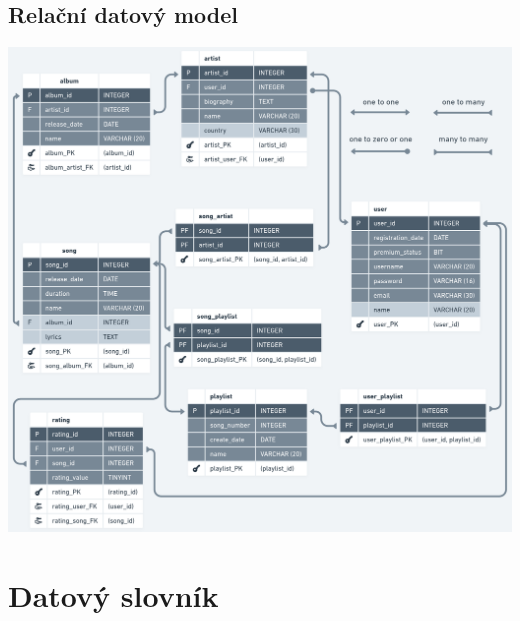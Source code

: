 \documentclass[czech,12pt,a4paper,titlepage]{article}
\begin{document}
    \subsection*{Relační datový model}
    \bigskip
    \bigskip
    \includegraphics[width=1\textwidth, center]{relacni_datovy_model}

    \clearpage


    \section{Datový slovník}\label{sec:datovy-slovnik}
    
\end{document}
